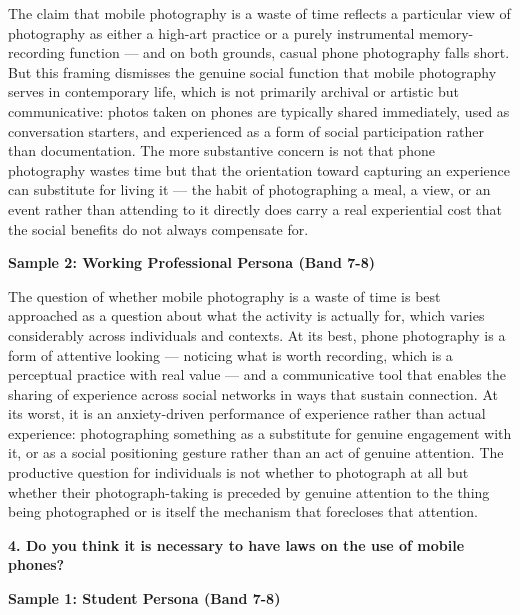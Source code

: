 The claim that mobile photography is a waste of time reflects a particular view of photography as either a high-art practice or a purely instrumental memory-recording function — and on both grounds, casual phone photography falls short. But this framing dismisses the genuine social function that mobile photography serves in contemporary life, which is not primarily archival or artistic but communicative: photos taken on phones are typically shared immediately, used as conversation starters, and experienced as a form of social participation rather than documentation. The more substantive concern is not that phone photography wastes time but that the orientation toward capturing an experience can substitute for living it — the habit of photographing a meal, a view, or an event rather than attending to it directly does carry a real experiential cost that the social benefits do not always compensate for.

\textbf{Sample 2: Working Professional Persona (Band 7-8)}

The question of whether mobile photography is a waste of time is best approached as a question about what the activity is actually for, which varies considerably across individuals and contexts. At its best, phone photography is a form of attentive looking — noticing what is worth recording, which is a perceptual practice with real value — and a communicative tool that enables the sharing of experience across social networks in ways that sustain connection. At its worst, it is an anxiety-driven performance of experience rather than actual experience: photographing something as a substitute for genuine engagement with it, or as a social positioning gesture rather than an act of genuine attention. The productive question for individuals is not whether to photograph at all but whether their photograph-taking is preceded by genuine attention to the thing being photographed or is itself the mechanism that forecloses that attention.

\separator

\begin{ieltsquestion}
\textbf{4. Do you think it is necessary to have laws on the use of mobile phones?}
\end{ieltsquestion}
\textbf{Sample 1: Student Persona (Band 7-8)}

